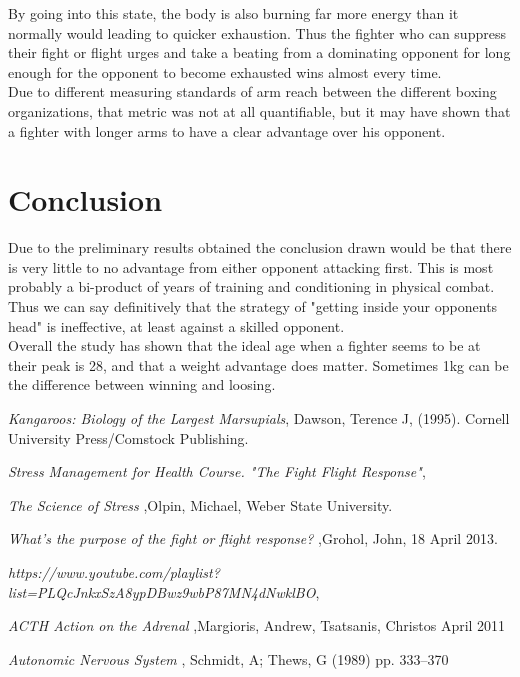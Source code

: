 \documentclass{article}
\begin{document}
By going into this state, the body is also burning far more energy than it normally would leading to quicker exhaustion. 
Thus the fighter who can suppress their fight or flight urges and take a beating from a dominating opponent for long enough for the opponent to become exhausted wins almost every time. \\
Due to different measuring standards of arm reach between the different boxing organizations, that metric was not at all quantifiable, but it may have shown  that a fighter with longer arms to have a clear advantage over his opponent.\\




\pagebreak

\section{Conclusion}
	Due to the preliminary results obtained the conclusion drawn would be that there is very little to no advantage from either opponent attacking first. This is most probably a bi-product of years of training and conditioning in physical combat.
Thus we can say definitively that the strategy of "getting inside your opponents head" is ineffective, at least against a skilled opponent.\\
Overall the study has shown that the ideal age when a fighter seems to be at their peak is 28, and that a weight advantage does matter. Sometimes 1kg can be the difference between winning and loosing.
	
	
	


\appendix


	
	\begin{thebibliography}{3}
  \emph{Kangaroos: Biology of the Largest Marsupials}, Dawson, Terence J, (1995).  Cornell University Press/Comstock Publishing.
  

  \emph{Stress Management for Health Course. "The Fight Flight Response"},
 


  \emph{The Science of Stress },Olpin, Michael, 
  Weber State University.
  

  \emph{What's the purpose of the fight or flight response? },Grohol, John, 
  18 April 2013.


  \emph{https://www.youtube.com/playlist?list=PLQcJnkxSzA8ypDBwz9wbP87MN4dNwklBO},

  \emph{ACTH Action on the Adrenal },Margioris, Andrew, Tsatsanis, Christos
   April 2011
   

  
  \emph{Autonomic Nervous System }, Schmidt, A; Thews, G (1989)
   pp. 333–370
\end{thebibliography}
\end{document}
